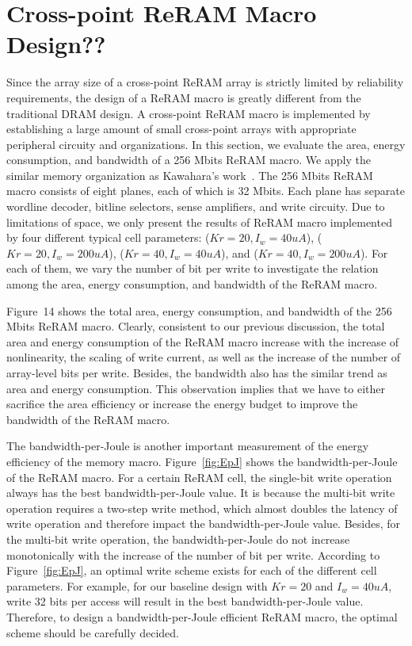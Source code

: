 
\section{Cross-point ReRAM Macro Design??}\label{sec:macro}
Since the array size of a cross-point ReRAM array is strictly limited by
reliability requirements, the design of a ReRAM macro is greatly different
from the traditional DRAM design. A cross-point ReRAM macro is implemented
by establishing a large amount of small cross-point arrays with
appropriate peripheral circuity and organizations. In this section, we
evaluate the area, energy consumption, and bandwidth of a 256 Mbits ReRAM
macro. We apply the similar memory organization as Kawahara's
work~\cite{crossbar_Panasonic}. The 256 Mbits ReRAM macro consists of
eight planes, each of which is 32 Mbits. Each plane has separate wordline
decoder, bitline selectors, sense amplifiers, and write circuity. Due to
limitations of space, we only present the results of ReRAM macro
implemented by four different typical cell parameters: ($Kr=20,
I_w=40uA$), ($Kr=20, I_w=200uA$), ($Kr=40, I_w=40uA$), and ($Kr=40,
I_w=200uA$). For each of them, we vary the number of bit per write to
investigate the relation among the area, energy consumption, and bandwidth
of the ReRAM macro.


Figure~14 shows the total area, energy consumption, and bandwidth of the
256 Mbits ReRAM macro. Clearly, consistent to our previous discussion, the
total area and energy consumption of the ReRAM macro increase with the
increase of nonlinearity, the scaling of write current, as well as the
increase of the number of array-level bits per write. Besides, the
bandwidth also has the similar trend as area and energy consumption. This
observation implies that we have to either sacrifice the area efficiency
or increase the energy budget to improve the bandwidth of the ReRAM macro.

The bandwidth-per-Joule is another important measurement of the energy
efficiency of the memory macro. Figure~\ref{fig:EpJ} shows the
bandwidth-per-Joule of the ReRAM macro. For a certain ReRAM cell, the
single-bit write operation always has the best bandwidth-per-Joule value.
It is because the multi-bit write operation requires a two-step write
method, which almost doubles the latency of write operation and therefore
impact the bandwidth-per-Joule value. Besides, for the multi-bit write
operation, the bandwidth-per-Joule do not increase monotonically with the
increase of the number of bit per write. According to
Figure~\ref{fig:EpJ}, an optimal write scheme exists for each of the
different cell parameters. For example, for our baseline design with
$Kr=20$ and $I_w=40uA$, write 32 bits per access will result in the best
bandwidth-per-Joule value. Therefore, to design a bandwidth-per-Joule
efficient ReRAM macro, the optimal scheme should be carefully decided.


